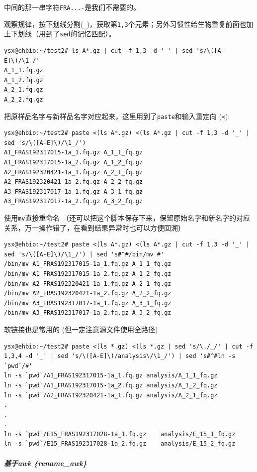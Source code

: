 \documentclass[]{article}
\numberwithin{figure}{section}
\numberwithin{table}{section}
\begin{document}
中间的那一串字符\texttt{FRA...-}是我们不需要的。

观察规律，按下划线分割(\texttt{\_})，获取第\texttt{1,3}个元素；另外习惯性给生物重复前面也加上下划线（用到了\texttt{sed}的记忆匹配）。

\begin{verbatim}
ysx@ehbio:~/test2# ls A*.gz | cut -f 1,3 -d '_' | sed 's/\([A-E]\)/\1_/'
A_1_1.fq.gz
A_1_2.fq.gz
A_2_1.fq.gz
A_2_2.fq.gz
\end{verbatim}

把原样品名字与新样品名字对应起来，这里用到了\texttt{paste}和输入重定向 (\texttt{\textless{}}):

\begin{verbatim}
ysx@ehbio:~/test2# paste <(ls A*.gz) <(ls A*.gz | cut -f 1,3 -d '_' | sed 's/\([A-E]\)/\1_/')
A1_FRAS192317015-1a_1.fq.gz	A_1_1_fq.gz
A1_FRAS192317015-1a_2.fq.gz	A_1_2_fq.gz
A2_FRAS192320421-1a_1.fq.gz	A_2_1_fq.gz
A2_FRAS192320421-1a_2.fq.gz	A_2_2_fq.gz
A3_FRAS192317017-1a_1.fq.gz	A_3_1_fq.gz
A3_FRAS192317017-1a_2.fq.gz	A_3_2_fq.gz
\end{verbatim}

使用\texttt{mv}直接重命名 （还可以把这个脚本保存下来，保留原始名字和新名字的对应关系，万一操作错了，在看到结果异常时也可以方便回溯）

\begin{verbatim}
ysx@ehbio:~/test2# paste <(ls A*.gz) <(ls A*.gz | cut -f 1,3 -d '_' | sed 's/\([A-E]\)/\1_/') | sed 's#^#/bin/mv #'
/bin/mv A1_FRAS192317015-1a_1.fq.gz	A_1_1_fq.gz
/bin/mv A1_FRAS192317015-1a_2.fq.gz	A_1_2_fq.gz
/bin/mv A2_FRAS192320421-1a_1.fq.gz	A_2_1_fq.gz
/bin/mv A2_FRAS192320421-1a_2.fq.gz	A_2_2_fq.gz
/bin/mv A3_FRAS192317017-1a_1.fq.gz	A_3_1_fq.gz
/bin/mv A3_FRAS192317017-1a_2.fq.gz	A_3_2_fq.gz
\end{verbatim}

软链接也是常用的 (但一定注意源文件使用全路径)

\begin{verbatim}
ysx@ehbio:~/test2# paste <(ls *.gz) <(ls *.gz | sed 's/\./_/' | cut -f 1,3,4 -d '_' | sed 's/\([A-E]\)/analysis\/\1_/') | sed 's#^#ln -s `pwd`/#'
ln -s `pwd`/A1_FRAS192317015-1a_1.fq.gz	analysis/A_1_1_fq.gz
ln -s `pwd`/A1_FRAS192317015-1a_2.fq.gz	analysis/A_1_2_fq.gz
ln -s `pwd`/A2_FRAS192320421-1a_1.fq.gz	analysis/A_2_1_fq.gz
.
.
.
ln -s `pwd`/E15_FRAS192317028-1a_1.fq.gz	analysis/E_15_1_fq.gz
ln -s `pwd`/E15_FRAS192317028-1a_2.fq.gz	analysis/E_15_2_fq.gz
\end{verbatim}

\hypertarget{ux57faux4e8eawk-rename_awk}{%
\subparagraph{基于awk \{rename\_awk\}}\label{ux57faux4e8eawk-rename_awk}}
\end{document}
